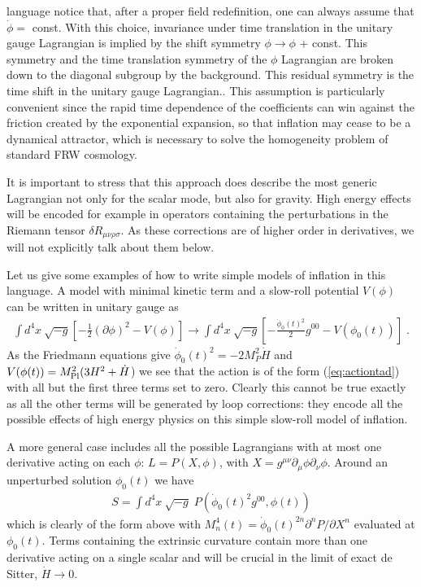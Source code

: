 \documentclass[12pt,letterpaper]{article}
\def\be{\begin{eqnarray}}
\def\ee{\end{eqnarray}}
\begin{document}
{{  language notice that, after a proper field redefinition, one can
  always assume that $\dot\phi =$ const. With this choice, invariance
  under time translation in the unitary gauge Lagrangian is implied by
  the shift symmetry $\phi \to \phi $ + const. This symmetry and the
  time translation symmetry of the $\phi$ Lagrangian are broken down
  to the diagonal subgroup by the background. This residual symmetry
  is the time shift in the unitary gauge Lagrangian.}. This assumption
is particularly convenient since the rapid time dependence of the coefficients can win against the friction created by the exponential expansion, so that inflation may cease to be a dynamical attractor, which is necessary to solve the homogeneity problem of standard FRW cosmology.   

It is important to stress that this approach does describe the
most generic Lagrangian not only for the scalar mode, but also for 
gravity. High energy effects will be encoded for example in operators
containing the perturbations in the Riemann tensor $\delta
R_{\mu\nu\rho\sigma}$. As these corrections are of higher order in
derivatives, we will not explicitly talk about them below.

Let us give some examples of how to write simple models of inflation in this language. A model with minimal kinetic term and a slow-roll potential $V(\phi)$ can be written in unitary gauge as 
\be
\int \! d^4x \: \sqrt{-g}
\left[ -\frac 1 2 (\partial \phi)^2 - V(\phi) \right]  \to  \int \!
d^4x \: \sqrt{- g} \left[ -\frac{\dot \phi_0(t)^2}{2} g^{00} - V(\phi_0(t))
\right] \; .
\ee
As the Friedmann equations give 
$\dot\phi_0(t)^2=-2M^2_P \dot{H}$ and $V(\phi(t))=M_{\rm Pl}^2 (3H^2+\dot H$) we see that the action is of the form (\ref{eq:actiontad}) with all but the first three terms set to zero. Clearly this cannot be true exactly as all the other terms will be generated by loop corrections: they encode all the possible effects of high energy physics on this simple slow-roll model of inflation.

A more general case includes all the possible Lagrangians with at most one derivative acting on each $\phi$: $L= P(X,\phi)$, with $X=g^{\mu\nu}\partial_\mu\phi\partial_\nu\phi$. Around an unperturbed solution $\phi_0(t)$ we have
\be
S = \int \! d^4x \: \sqrt{-g} \;  P(\dot\phi_0(t)^2 g^{00}, \phi(t))
\ee
 which is clearly of the form above with $M_n^4(t) =\dot\phi_0(t)^{2n} \partial^n P/\partial X^n$ evaluated at $\phi_0(t)$.
 Terms containing the extrinsic curvature contain more than one
 derivative acting on a single scalar and will be crucial in the limit
 of exact de Sitter, $\dot H \to 0$.





}
\end{document}
